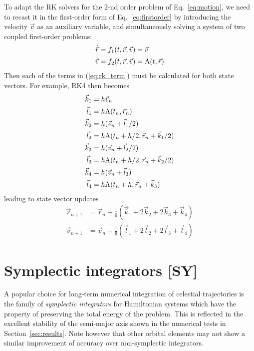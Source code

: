 \documentclass[a4paper]{article}
\begin{document}
To adapt the RK solvers for the 2-nd order problem of Eq.~\ref{eq:motion}, we need to recast it in the first-order form of Eq.~\ref{eq:firstorder} by introducing the velocity $\vec{v}$ as an auxiliary variable, and simultaneously solving a system of two coupled first-order problems:
\begin{equation*}
\begin{split}
\dot{\vec{r}} &= f_1(t,\vec{r},\vec{v}) = \vec{v} \\
\dot{\vec{v}} &= f_2(t,\vec{r},\vec{v}) = \mathrm{A}(t,\vec{r})
\end{split}
\end{equation*}
Then each of the terms in (\ref{eq:rk_term}) must be calculated for both state vectors. For example, RK4 then becomes
\begin{equation*}
\begin{split}
\vec{k}_1 &= h\vec{v}_n \\
\vec{l}_1 &= h\mathrm{A}(t_n, \vec{r}_n) \\
\vec{k}_2 &= h(\vec{v}_n+\vec{l}_1/2) \\
\vec{l}_2 &= h\mathrm{A}(t_n+h/2, \vec{r}_n+\vec{k}_1/2) \\
\vec{k}_3 &= h(\vec{v}_n+\vec{l}_2/2) \\
\vec{l}_3 &= h\mathrm{A}(t_n+h/2, \vec{r}_n+\vec{k}_2/2) \\
\vec{k}_4 &= h(\vec{v}_n + \vec{l}_3) \\
\vec{l}_4 &= h\mathrm{A}(t_n+h, \vec{r}_n+\vec{k}_3)
\end{split}
\end{equation*}
leading to state vector updates
\begin{equation*}
\begin{split}
\vec{r}_{n+1} &= \vec{r}_n + \frac{1}{6}(\vec{k}_1 + 2\vec{k}_2 + 2\vec{k}_3 + \vec{k}_4) \\
\vec{v}_{n+1} &= \vec{v}_n + \frac{1}{6}(\vec{l}_1 + 2\vec{l}_2 + 2\vec{l}_3 + \vec{l}_4)
\end{split}
\end{equation*}

\section{Symplectic integrators [SY]}
A popular choice for long-term numerical integration of celestial trajectories is the family of \emph{symplectic integrators} for Hamiltonian systems which have the property of preserving the total energy of the problem. This is reflected in the excellent stability of the semi-major axis shown in the numerical tests in Section~\ref{sec:results}. Note however that other orbital elements may not show a similar improvement of accuracy over non-symplectic integrators.
\end{document}
